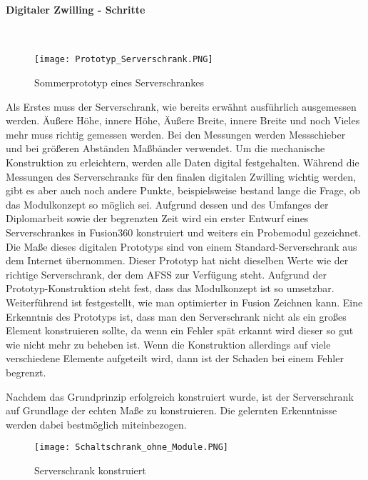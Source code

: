     \paragraph{Digitaler Zwilling - Schritte}\mbox{}\\ 
    \begin{wrapfigure}{r}{0.3\textwidth}
        \vspace{-20px}
        \texttt{[image: Prototyp\_Serverschrank.PNG]}
        \caption{Sommerprototyp eines Serverschrankes}
        \vspace{-20px}
        \label{fig:Sommerprototyp}
    \end{wrapfigure}
    Als Erstes muss der Serverschrank, wie bereits erwähnt ausführlich ausgemessen werden. Äußere Höhe, innere Höhe, Äußere Breite, innere Breite und noch Vieles mehr muss richtig gemessen werden.    
    Bei den Messungen werden Messschieber und bei größeren Abständen Maßbänder verwendet. Um die mechanische Konstruktion zu erleichtern, werden alle Daten digital festgehalten.   
    Während die Messungen des Serverschranks für den finalen digitalen Zwilling wichtig werden, gibt es aber auch noch andere Punkte, beispielsweise bestand lange die Frage, ob das Modulkonzept so möglich sei. Aufgrund dessen und des Umfanges der Diplomarbeit sowie der begrenzten Zeit wird ein erster Entwurf eines Serverschrankes in Fusion360 konstruiert und weiters ein Probemodul gezeichnet. Die Maße dieses digitalen Prototyps sind von einem Standard-Serverschrank aus dem Internet übernommen.
    Dieser Prototyp hat nicht dieselben Werte wie der richtige Serverschrank, der dem AFSS zur Verfügung steht. Aufgrund der Prototyp-Konstruktion steht fest, dass das Modulkonzept ist so umsetzbar. Weiterführend ist festgestellt, wie man optimierter in Fusion Zeichnen kann.
    Eine Erkenntnis des Prototyps ist, dass man den Serverschrank nicht als ein großes Element konstruieren sollte, da wenn ein Fehler spät erkannt wird dieser so gut wie nicht mehr zu beheben ist. Wenn die Konstruktion allerdings auf viele verschiedene Elemente aufgeteilt wird, dann ist der Schaden bei einem Fehler begrenzt. 

    Nachdem das Grundprinzip erfolgreich konstruiert wurde, ist der Serverschrank auf Grundlage der echten Maße zu konstruieren. Die gelernten Erkenntnisse werden dabei bestmöglich miteinbezogen.\\    
    \begin{wrapfigure}{r}{0.35\textwidth} %
        \vspace{-20px}
        \texttt{[image: Schaltschrank\_ohne\_Module.PNG]} 
        \caption{Serverschrank konstruiert}
        \vspace{-50px}
        \label{fig:Clean_Serverschrank}
    \end{wrapfigure}

